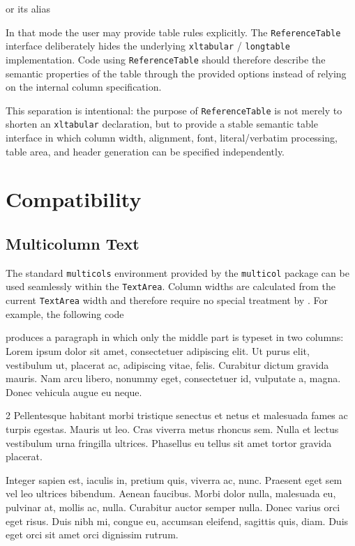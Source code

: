 \documentclass[
11pt,
a4paper,
oneside
]{scrbook}
\begin{document}


or its alias




In that mode the user may provide table rules explicitly.
The \texttt{ReferenceTable} interface deliberately hides the underlying
\texttt{xltabular} / \texttt{longtable} implementation. Code using
\texttt{ReferenceTable} should therefore describe the semantic properties of
the table through the provided options instead of relying on the internal
column specification.

This separation is intentional: the purpose of \texttt{ReferenceTable} is
not merely to shorten an \texttt{xltabular} declaration, but to provide a
stable semantic table interface in which column width, alignment, font,
literal/verbatim processing, table area, and header generation can be
specified independently.

\chapter{Compatibility}

\section{Multicolumn Text}
The standard \texttt{multicols} environment provided by the
\texttt{multicol} package can be used seamlessly within the
\texttt{TextArea}. Column widths are calculated from the current
\texttt{TextArea} width and therefore require no special treatment
by \MDWordmark.
For example, the following code




produces a paragraph in which only the middle part is typeset in two
columns:\\[1ex]

Lorem ipsum dolor sit amet, consectetuer adipiscing elit. Ut purus elit, vestibulum ut, placerat ac, adipiscing vitae, felis. Curabitur dictum gravida mauris. Nam arcu libero, nonummy eget, consectetuer id, vulputate a, magna. Donec vehicula augue eu neque.
\begin{multicols}{2}
	Pellentesque habitant morbi tristique senectus et netus et malesuada fames ac turpis egestas. Mauris ut leo. Cras viverra metus rhoncus sem. Nulla et lectus vestibulum urna fringilla ultrices. Phasellus eu tellus sit amet tortor gravida placerat.
\end{multicols}
Integer sapien est, iaculis in, pretium quis, viverra ac, nunc. Praesent eget sem vel leo ultrices bibendum. Aenean faucibus. Morbi dolor nulla, malesuada eu, pulvinar at, mollis ac, nulla. Curabitur auctor semper nulla. Donec varius orci eget risus. Duis nibh mi, congue eu, accumsan eleifend, sagittis quis, diam. Duis eget orci sit amet orci dignissim rutrum. \\[2ex]
\end{document}
